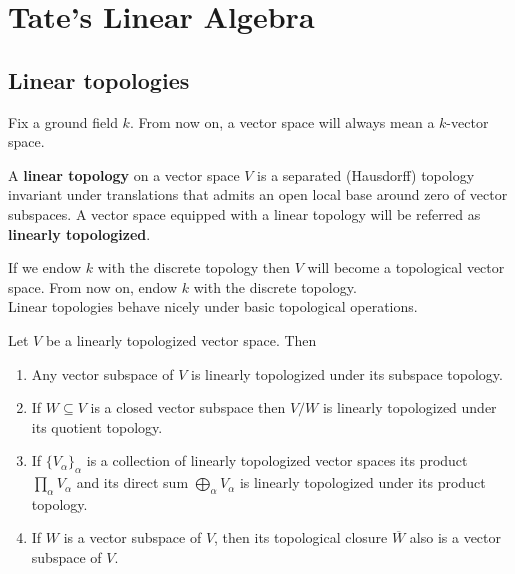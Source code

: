 \chapter{Tate's Linear Algebra}\label{ch:tate-linear-algebra}
\section{Linear topologies}
Fix a ground field $k$. From now on, a vector space will always mean a $k$-vector space.
\begin{definition}\label{def:linear_topology}
A \textbf{linear topology} on a vector space $V$ is a separated (Hausdorff) topology invariant under translations that admits an open local base around zero of vector subspaces. A vector space equipped with a linear topology will be referred as \textbf{linearly topologized}.
\end{definition}
If we endow $k$ with the discrete topology then $V$ will become a topological vector space. From now on, endow $k$ with the discrete topology. \\
Linear topologies behave nicely under basic topological operations.
\begin{proposition}\label{prop:linear_topologies_properties}
Let $V$ be a linearly topologized vector space. Then
	\begin{enumerate}[label = (\alph*)]
		\item Any vector subspace of $V$ is linearly topologized under its subspace topology.
		\item If $W \subseteq V$ is a closed vector subspace then $V/W$ is linearly topologized under its quotient topology.
		\item If $\{V_{\alpha}\}_{\alpha}$ is a collection of linearly topologized vector spaces its product $\prod_{\alpha} V_{\alpha}$ and its direct sum $\bigoplus_{\alpha} V_{\alpha}$ is linearly topologized under its product topology.
		\item If $W$ is a vector subspace of $V$, then its topological closure $\overline{W}$ also is a vector subspace of $V$.
	\end{enumerate}
\end{proposition}
